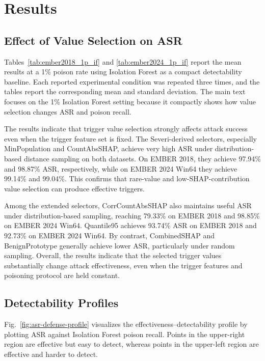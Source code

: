 \section{Results}
\subsection{Effect of Value Selection on ASR}
Tables~\ref{tab:ember2018_1p_if} and \ref{tab:ember2024_1p_if} report the mean results at a 1\% poison rate using Isolation Forest as a compact detectability baseline.
Each reported experimental condition was repeated three times, and the tables report the corresponding mean and standard deviation.
The main text focuses on the 1\% Isolation Forest setting because it compactly shows how value selection changes ASR and poison recall.

The results indicate that trigger value selection strongly affects attack success even when the trigger feature set is fixed.
The Severi-derived selectors, especially MinPopulation and CountAbsSHAP, achieve very high ASR under distribution-based distance sampling on both datasets.
On EMBER 2018, they achieve 97.94\% and 98.87\% ASR, respectively, while on EMBER 2024 Win64 they achieve 99.14\% and 99.04\%.
This confirms that rare-value and low-SHAP-contribution value selection can produce effective triggers.

Among the extended selectors, CorrCountAbsSHAP also maintains useful ASR under distribution-based sampling, reaching 79.33\% on EMBER 2018 and 98.85\% on EMBER 2024 Win64.
Quantile95 achieves 93.74\% ASR on EMBER 2018 and 92.73\% on EMBER 2024 Win64. By contrast, CombinedSHAP and BenignPrototype generally achieve lower ASR, particularly under random sampling.
Overall, the results indicate that the selected trigger values substantially change attack effectiveness, even when the trigger features and poisoning protocol are held constant.




\subsection{Detectability Profiles}
Fig.~\ref{fig:asr-defense-profile} visualizes the effectiveness--detectability profile by plotting ASR against Isolation Forest poison recall.
Points in the upper-right region are effective but easy to detect, whereas points in the upper-left region are effective and harder to detect.

